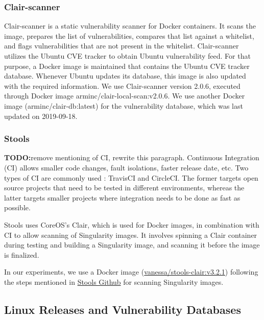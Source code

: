 \documentclass[a4paper,num-refs]{oup-contemporary}
\newcommand{\todo}[1]{\color{red}\textbf{TODO:}#1\color{black}}
\begin{document}
\subsubsection{Clair-scanner}

Clair-scanner is a static vulnerability scanner for Docker containers.
It scans the image, prepares the list of
vulnerabilities, compares that list against a whitelist, and flags vulnerabilities
that are not present in the whitelist.
Clair-scanner utilizes the Ubuntu CVE tracker to obtain  Ubuntu vulnerability feed.
For that purpose, a Docker image is maintained that contains the Ubuntu CVE tracker database.
Whenever Ubuntu updates its database, this image is also updated with the required information.
We use Clair-scanner version 2.0.6, executed through  Docker image arminc/clair-local-scan:v2.0.6. 
We use another Docker image (arminc/clair-db:latest) for the vulnerability database, which was
last updated on 2019-09-18.

\subsubsection{Stools}

\todo{remove mentioning of CI, rewrite this paragraph.}
Continuous Integration (CI) allows smaller code changes, fault isolations,
faster release date, etc. Two types of CI are commonly used : TravisCI and
CircleCI. The former targets open source projects that need to be tested in
different environments, whereas the latter targets smaller projects where
integration needs to be done as fast as possible. 

Stools uses CoreOS's Clair, which
is used for Docker images, in combination with CI to allow scanning of
Singularity images.
It involves spinning a Clair container during testing and building a
Singularity image, and scanning it before the image is finalized.

In our experiments, we use a Docker image (\href{https://hub.docker.com/r/vanessa/stools-clair}{vanessa/stools-clair:v3.2.1})
following the steps mentioned in \href{https://github.com/singularityhub/stools}{Stools Github} for scanning
Singularity images.

\subsection{Linux Releases and Vulnerability Databases}
\end{document}
